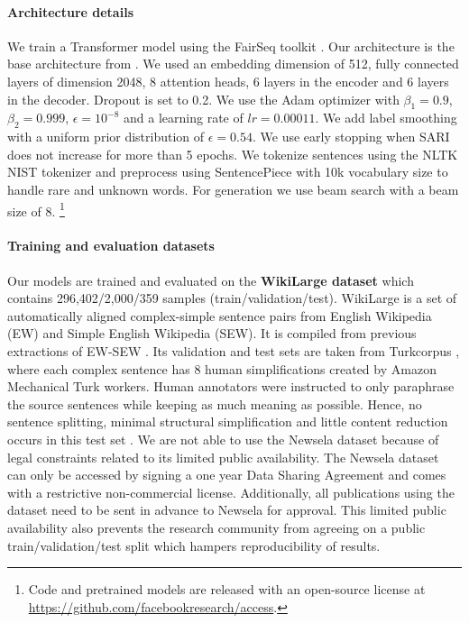 \documentclass[10pt, a4paper]{article}
\begin{document}
\paragraph{Architecture details}
We train a Transformer model \cite{vaswani2017attention} using the FairSeq toolkit \cite{ott2019fairseq}.
Our architecture is the base architecture from \cite{vaswani2017attention}. We used an embedding dimension of 512, fully connected layers of dimension 2048, 8 attention heads, 6 layers in the encoder and 6 layers in the decoder. Dropout is set to 0.2. We use the Adam optimizer \cite{kingma2014adam} with $\beta_1 = 0.9$, $\beta_2 = 0.999$, $\epsilon = 10^{ -8}$ and a learning rate of $lr = 0.00011$. We add label smoothing with a uniform prior distribution of $\epsilon = 0.54$. We use early stopping when SARI does not increase for more than 5 epochs. We tokenize sentences using the NLTK NIST tokenizer and preprocess using SentencePiece \cite{kudo2018sentencepiece} with 10k vocabulary size to handle rare and unknown words. For generation we use beam search with a beam size of 8.
\footnote{Code and pretrained models are released with an open-source license at \mbox{\url{https://github.com/facebookresearch/access}}.}

\paragraph{Training and evaluation datasets}
Our models are trained and evaluated on the \textbf{WikiLarge dataset}  which contains 296,402/2,000/359 samples (train/validation/test).
WikiLarge is a set of automatically aligned complex-simple sentence pairs from English Wikipedia (EW) and Simple English Wikipedia (SEW). It is compiled from previous extractions of EW-SEW \cite{zhu2010monolingual,woodsend2011learning,kauchak2013improving}.
Its validation and test sets are taken from Turkcorpus , where each complex sentence has 8 human simplifications created by Amazon Mechanical Turk workers.
Human annotators were instructed to only paraphrase the source sentences while keeping as much meaning as possible. Hence, no sentence splitting, minimal structural simplification and little content reduction occurs in this test set \cite{xu2016optimizing}.
We are not able to use the Newsela dataset  because of legal constraints related to its limited public availability. The Newsela dataset can only be accessed by signing a one year Data Sharing Agreement and comes with a restrictive non-commercial license.
Additionally, all publications using the dataset need to be sent in advance to Newsela for approval.
This limited public availability also prevents the research community from agreeing on a public train/validation/test split which hampers reproducibility of results.
\end{document}
